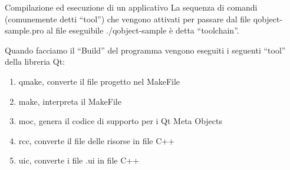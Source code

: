 \documentclass[10pt, aspectratio=169]{beamer}
\begin{document}
\begin{frame}{Compilazione ed esecuzione di un applicativo}
	La sequenza di comandi (comunemente detti ``tool'') che vengono attivati per passare dal file {\ttfamily qobject-sample.pro} al file eseguibile {\ttfamily ./qobject-sample} è detta ``toolchain''.
	
	Quando facciamo il ``Build'' del programma vengono eseguiti i seguenti ``tool'' della libreria Qt:
	\begin{enumerate}
		\item {\ttfamily qmake}, converte il file progetto nel {\ttfamily MakeFile}
		\item {\ttfamily make}, interpreta il {\ttfamily MakeFile}
		\item {\ttfamily moc}, genera il codice di supporto per i Qt Meta Objects
		\item {\ttfamily rcc}, converte il file delle risorse in file {\ttfamily C++}
		\item {\ttfamily uic}, converte i file {\ttfamily .ui} in file {\ttfamily C++}
	\end{enumerate}
\end{frame}
\end{document}
